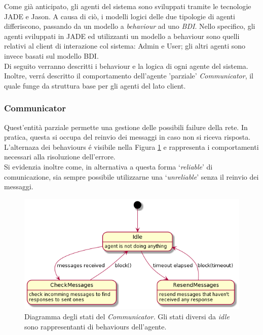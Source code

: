 
Come già anticipato, gli agenti del sistema sono sviluppati tramite le tecnologie JADE e Jason. A causa di ciò, i modelli logici delle due tipologie di agenti differiscono, passando da un modello a \textit{behaviour} ad uno \textit{BDI}. Nello specifico, gli agenti sviluppati in JADE ed utilizzanti un modello a behaviour sono quelli relativi al client di interazione col sistema: Admin e User; gli altri agenti sono invece basati sul modello BDI.\\
Di seguito verranno descritti i behaviour e la logica di ogni agente del sistema. Inoltre, verr\'a descritto il comportamento dell'agente 'parziale' \textit{Communicator}, il quale funge da struttura base per gli agenti del lato client.

\subsubsection{Communicator}
Quest'entità parziale permette una gestione delle possibili failure della rete. In pratica, questa si occupa del reinvio dei messaggi in caso non si riceva risposta.\\
L'alternaza dei behaviours \'e visibile nella Figura \ref{fig:communicator_state_diagrams} e rappresenta i comportamenti necessari alla risoluzione dell'errore.\\
Si evidenzia inoltre come, in alternativa a questa forma `\textit{reliable}' di comunicazione, sia sempre possibile utilizzarne una `\textit{unreliable}' senza il reinvio dei messaggi.
\begin{figure}[!ht]\centering
    \includegraphics[width=\textwidth]{section/design/figure/agent/communicator_states.png}
    \caption{Diagramma degli stati del \textit{Communicator.} Gli stati diversi da \textit{idle} sono rappresentanti di behaviours dell'agente.}
    \label{fig:communicator_state_diagrams}
\end{figure}

